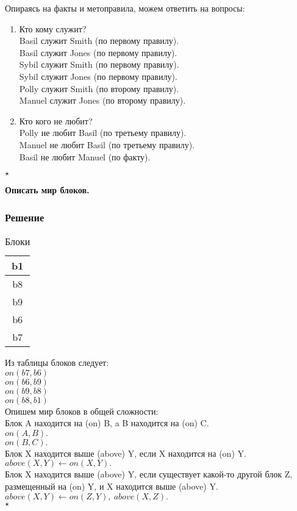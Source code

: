 \documentclass[a4paper,titlepage,oneside]{article}
\begin{document}
    Опираясь на факты и метоправила, можем ответить на вопросы:
    \begin{enumerate}
    \item Кто кому служит? \\
          Basil служит Smith (по первому правилу). \\
          Basil служит Jones (по первому правилу). \\
          Sybil служит Smith (по первому правилу). \\
          Sybil служит Jones (по первому правилу). \\
          Polly служит Smith (по второму правилу). \\
          Manuel служит Jones (по второму правилу). 
    \item Кто кого не любит? \\
          Polly не любит Basil (по третьему правилу). \\
          Manuel не любит Basil (по третьему правилу). \\
          Basil не любит Manuel (по факту).
    \end{enumerate}
$\star$

\begin{center}
    \textbf{ Описать мир блоков.}
\end{center} 

\subsubsection*{Решение}
\begin{table}[h]
	\caption{Блоки}
	\begin{center}
		\begin{tabular}{|c|}
			\hline
			b1 \\
			\hline
			b8 \\
			\hline
			b9 \\
			\hline
			b6 \\
			\hline
			b7 \\
			\hline
		\end{tabular}
	\end{center}
\end{table}

Из таблицы блоков следует:\\
$on(b7, b6)$ \\
$on(b6, b9)$ \\
$on(b9, b8)$ \\
$on(b8, b1)$ \\

Опишем мир блоков в общей сложности:\\
Блок A находится на (on) B, a B находится на (on) C. \\  
$on(A, B).$ \\
$on(B, C).$ \\
Блок X находится выше (above) Y, если X находится на (on) Y. \\
$above(X, Y) \leftarrow on(X, Y).$ \\
Блок X находится выше (above) Y, если существует какой-то другой блок Z, размещенный на (on) Y, и X находится выше (above) Y.  \\
$above(X, Y) \leftarrow on(Z, Y),\ above(X, Z).$ \\
$\star$
\end{document}
